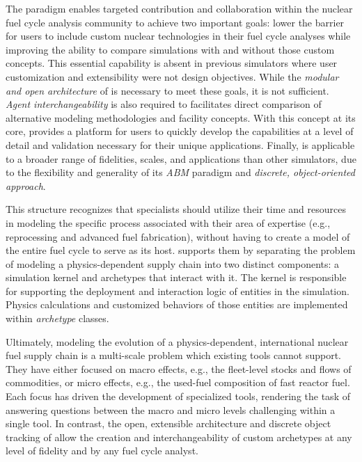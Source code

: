 The \Cyclus paradigm enables targeted contribution and collaboration within the
nuclear fuel cycle analysis community to achieve two important goals: lower the
barrier for users to include custom nuclear technologies in their fuel cycle
analyses while improving the ability to compare simulations with and without
those custom concepts.  This essential capability is absent in
previous simulators where user customization and extensibility were not design
objectives.  While the \emph{modular and open architecture} of
\Cyclus is necessary to meet these goals, it is not sufficient.
\emph{Agent interchangeability} is also required to facilitates direct comparison
of alternative modeling methodologies and facility concepts. With this concept
at its core, \Cyclus provides a platform for users to quickly develop the
capabilities at a level of detail and validation necessary for their
unique applications.  Finally, \Cyclus is applicable to a broader range of
fidelities, scales, and applications than other simulators, due to the
flexibility and generality of its \emph{\gls{ABM}} paradigm and \emph{discrete,
object-oriented approach}.

This structure recognizes that specialists should utilize their time and
resources in modeling the specific process associated with their area of
expertise (e.g., reprocessing and advanced fuel fabrication), without having to
create a model of the entire fuel cycle to serve as its host.  \Cyclus supports
them by separating the problem of modeling a physics-dependent supply chain into
two distinct components: a simulation kernel and archetypes that interact with
it. The kernel is responsible for supporting the deployment and
interaction logic of entities in the simulation.  Physics calculations and
customized behaviors of those entities are implemented within \emph{archetype}
classes.

Ultimately, modeling the evolution of a physics-dependent, international
nuclear fuel supply chain is a multi-scale problem which existing tools cannot
support. They have either focused on macro effects, e.g., the fleet-level
stocks and flows of commodities, or micro effects, e.g., the used-fuel
composition of fast reactor fuel. Each focus has driven the development of
specialized tools, rendering the task of answering questions between the macro
and micro levels challenging within a single tool.  In contrast, the open, extensible
architecture and discrete object tracking of \Cyclus allow the creation and
interchangeability of custom archetypes at any level of fidelity and by any
fuel cycle analyst.



